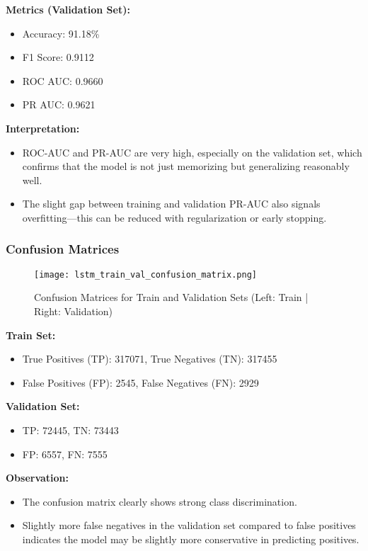 \documentclass[12pt]{article}
\begin{document}
\textbf{Metrics (Validation Set):}
\begin{itemize}
    \item Accuracy: 91.18\%
    \item F1 Score: 0.9112
    \item ROC AUC: 0.9660
    \item PR AUC: 0.9621
\end{itemize}

\textbf{Interpretation:}
\begin{itemize}
    \item ROC-AUC and PR-AUC are very high, especially on the validation set, which confirms that the model is not just memorizing but generalizing reasonably well.
    \item The slight gap between training and validation PR-AUC also signals overfitting—this can be reduced with regularization or early stopping.
\end{itemize}

\subsubsection*{Confusion Matrices}

\begin{figure}[H]
    \centering
    \texttt{[image: lstm\_train\_val\_confusion\_matrix.png]}
    \caption{Confusion Matrices for Train and Validation Sets (Left: Train | Right: Validation)}
\end{figure}

\textbf{Train Set:}
\begin{itemize}
    \item True Positives (TP): 317071, True Negatives (TN): 317455
    \item False Positives (FP): 2545, False Negatives (FN): 2929
\end{itemize}

\textbf{Validation Set:}
\begin{itemize}
    \item TP: 72445, TN: 73443
    \item FP: 6557, FN: 7555
\end{itemize}

\textbf{Observation:}
\begin{itemize}
    \item The confusion matrix clearly shows strong class discrimination.
    \item Slightly more false negatives in the validation set compared to false positives indicates the model may be slightly more conservative in predicting positives.
\end{itemize}
\end{document}
